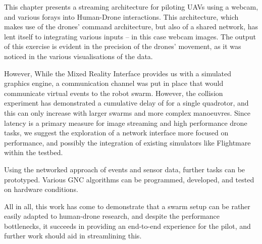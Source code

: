 
This chapter presents a streaming architecture for piloting UAVs using a webcam, and various forays into Human-Drone interactions. This architecture, which makes use of the drones’ command architecture, but also of a shared network, has lent itself to integrating various inputs – in this case webcam images. The output of this exercise is evident in the precision of the drones’ movement, as it was noticed in the various visualisations of the data. 

However, While the Mixed Reality Interface provides us with a simulated graphics engine, a communication channel was put in place that would communicate virtual events to the robot swarm. However, the collision experiment has demonstrated a cumulative delay of   for a single quadrotor, and this can only increase with larger swarms and more complex manoeuvres. Since latency is a primary measure for image streaming and high performance drone tasks, we suggest the exploration of a network interface more focused on performance, and possibly the integration of existing simulators like Flightmare within the testbed.%


Using the networked approach of events and sensor data, further tasks can be prototyped. Various GNC algorithms can be programmed, developed, and tested on hardware conditions. 

All in all, this work has come to demonstrate that a swarm setup can be rather easily adapted to human-drone research, and despite the performance bottlenecks, it succeeds in providing an end-to-end experience for the pilot, and further work should aid in streamlining this.

